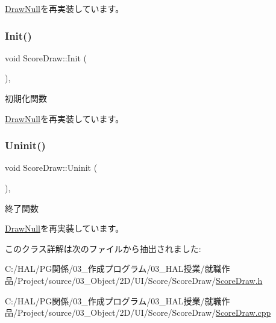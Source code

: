 \mbox{\hyperlink{class_draw_null_adede079e9c11a756090740b20bb43022}{Draw\+Null}}を再実装しています。

\mbox{\label{class_score_draw_af013abb96136825e71d4fee06529fc69}} 
\subsubsection{\texorpdfstring{Init()}{Init()}}
{\footnotesize\ttfamily void Score\+Draw\+::\+Init (\begin{DoxyParamCaption}{ }\end{DoxyParamCaption})\hspace{0.3cm}{\ttfamily [override]}, {\ttfamily [virtual]}}



初期化関数 



\mbox{\hyperlink{class_draw_null_acd7fef3ccea1da537ac9507ffbb6dd2e}{Draw\+Null}}を再実装しています。

\mbox{\label{class_score_draw_aad744f8a7a1202e6ba8117c660f297ee}} 
\subsubsection{\texorpdfstring{Uninit()}{Uninit()}}
{\footnotesize\ttfamily void Score\+Draw\+::\+Uninit (\begin{DoxyParamCaption}{ }\end{DoxyParamCaption})\hspace{0.3cm}{\ttfamily [override]}, {\ttfamily [virtual]}}



終了関数 



\mbox{\hyperlink{class_draw_null_a12d44e341c7364b5ab9cdd661dc16187}{Draw\+Null}}を再実装しています。



このクラス詳解は次のファイルから抽出されました\+:\begin{DoxyCompactItemize}
\item 
C\+:/\+H\+A\+L/\+P\+G関係/03\+\_\+作成プログラム/03\+\_\+\+H\+A\+L授業/就職作品/\+Project/source/03\+\_\+\+Object/2\+D/\+U\+I/\+Score/\+Score\+Draw/\mbox{\hyperlink{_score_draw_8h}{Score\+Draw.\+h}}\item 
C\+:/\+H\+A\+L/\+P\+G関係/03\+\_\+作成プログラム/03\+\_\+\+H\+A\+L授業/就職作品/\+Project/source/03\+\_\+\+Object/2\+D/\+U\+I/\+Score/\+Score\+Draw/\mbox{\hyperlink{_score_draw_8cpp}{Score\+Draw.\+cpp}}\end{DoxyCompactItemize}

